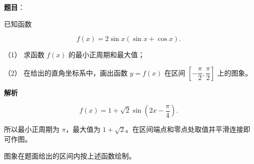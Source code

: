 \begin{answer}

\textbf{题目}：

已知函数

\nopagebreak[4]
\[
f(x)=2\sin x(\sin x+\cos x).
\]

（1） 求函数 $f(x)$ 的最小正周期和最大值；

（2） 在给出的直角坐标系中，画出函数 $y=f(x)$ 在区间 $\left[-\dfrac\pi2,\dfrac\pi2\right]$ 上的图象。
\nopagebreak[4]
\begin{center}\end{center}
\nopagebreak[4]

\textbf{解析}


\nopagebreak[4]
\[
f(x)=1+\sqrt2\sin\left(2x-\frac\pi4\right).
\]

所以最小正周期为 $\pi$，最大值为 $1+\sqrt2$。在区间端点和零点处取值并平滑连接即可作图。


图象在题面给出的区间内按上述函数绘制。



\end{answer}
